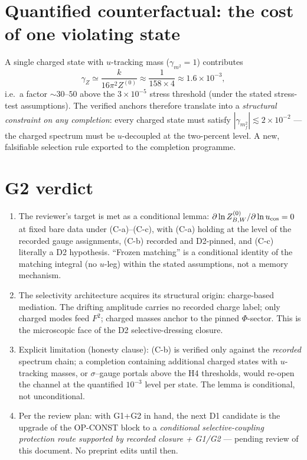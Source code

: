 \documentclass[11pt,a4paper]{article}
\begin{document}
\section{Quantified counterfactual: the cost of one violating state}
A single charged state with $u$-tracking mass ($\gamma_{m^2}=1$) contributes
\[
\gamma_Z\simeq\frac{k}{16\pi^2 Z^{(0)}}\approx\frac{1}{158\times4}
\approx1.6\times10^{-3},
\]
i.e.\ a factor $\sim30$--$50$ above the $3\times10^{-5}$ stress threshold
(under the stated stress-test assumptions). The verified anchors therefore
translate into a \emph{structural constraint on any completion}: every charged
state must satisfy $|\gamma_{m_f^2}|\lesssim2\times10^{-2}$ --- the charged
spectrum must be $u$-decoupled at the two-percent level. A new, falsifiable
selection rule exported to the completion programme.

\section{G2 verdict}
\begin{enumerate}[leftmargin=1.9em,itemsep=2pt,label=\textbf{V\arabic*.}]
\item The reviewer's target is met as a conditional lemma:
$\partial\ln Z_{B,W}^{(0)}/\partial\ln u_{\rm cos}=0$ at fixed bare data under
(C-a)--(C-c), with (C-a) holding at the level of the recorded gauge
assignments, (C-b) recorded
and D2-pinned, and (C-c) literally a D2 hypothesis. ``Frozen matching'' is a
conditional identity of the matching integral (no $u$-leg) within the stated
assumptions, not a memory mechanism.
\item The selectivity architecture acquires its structural origin:
charge-based mediation. The drifting amplitude carries no recorded charge
label; only charged
modes feed $F^2$; charged masses anchor to the pinned $\Phi$-sector. This is
the microscopic face of the D2 selective-dressing closure.
\item Explicit limitation (honesty clause): (C-b) is verified only against the
\emph{recorded} spectrum chain; a completion containing additional charged
states with $u$-tracking masses, or $\sigma$--gauge portals above the H4
thresholds, would re-open the channel at the quantified $10^{-3}$ level per
state. The lemma is conditional, not unconditional.
\item Per the review plan: with G1+G2 in hand, the next D1 candidate is the
upgrade of the OP-CONST block to a \emph{conditional selective-coupling
protection route supported by recorded closure + G1/G2} --- pending review of
this document. No preprint edits until then.
\end{enumerate}
\end{document}
